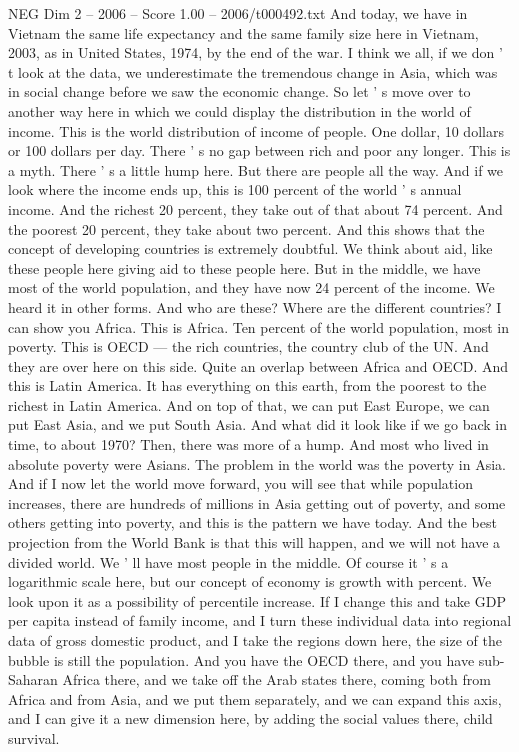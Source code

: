 \begin{textsample}{NEG Dim 2 – 2006 – Score 1.00 – 2006/t000492.txt}
And today, we have in Vietnam the same life expectancy and the same family size here in Vietnam, 2003, as in United States, 1974, by the end of the war.
I think we all, if we don ' t look at the data, we underestimate the tremendous change in Asia, which was in social change before we saw the economic change.
So let ' s move over to another way here in which we could display the distribution in the world of income.
This is the world distribution of income of people.
One dollar, 10 dollars or 100 dollars per day.
There ' s no gap between rich and poor any longer.
This is a myth.
There ' s a little hump here.
But there are people all the way.
And if we look where the income ends up, this is 100 percent of the world ' s annual income.
And the richest 20 percent, they take out of that about 74 percent.
And the poorest 20 percent, they take about two percent.
And this shows that the concept of developing countries is extremely doubtful.
We think about aid, like these people here giving aid to these people here.
But in the middle, we have most of the world population, and they have now 24 percent of the income.
We heard it in other forms.
And who are these?
Where are the different countries?
I can show you Africa.
This is Africa.
Ten percent of the world population, most in poverty.
This is OECD — the rich countries, the country club of the UN.
And they are over here on this side.
Quite an overlap between Africa and OECD.
And this is Latin America.
It has everything on this earth, from the poorest to the richest in Latin America.
And on top of that, we can put East Europe, we can put East Asia, and we put South Asia.
And what did it look like if we go back in time, to about 1970?
Then, there was more of a hump.
And most who lived in absolute poverty were Asians.
The problem in the world was the poverty in Asia.
And if I now let the world move forward, you will see that while population increases, there are hundreds of millions in Asia getting out of poverty, and some others getting into poverty, and this is the pattern we have today.
And the best projection from the World Bank is that this will happen, and we will not have a divided world.
We ' ll have most people in the middle.
Of course it ' s a logarithmic scale here, but our concept of economy is growth with percent.
We look upon it as a possibility of percentile increase.
If I change this and take GDP per capita instead of family income, and I turn these individual data into regional data of gross domestic product, and I take the regions down here, the size of the bubble is still the population.
And you have the OECD there, and you have sub-Saharan Africa there, and we take off the Arab states there, coming both from Africa and from Asia, and we put them separately, and we can expand this axis, and I can give it a new dimension here, by adding the social values there, child survival.

\end{textsample}
